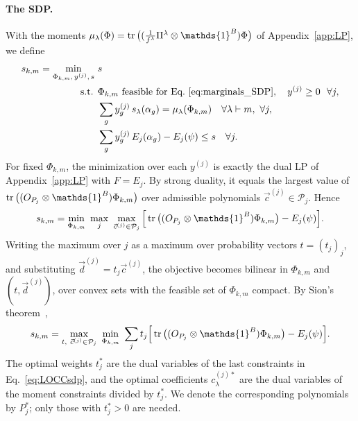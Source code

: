\documentclass[aps,pra,twocolumn,showpacs,superscriptaddress,groupedaddress]{revtex4-2}
\newcommand{\one}[0]{\mathds{1}}
\renewcommand{\a}{\alpha}
\newcommand{\I}{\one}
\begin{document}
\begin{widetext}
\paragraph*{The SDP.}
With the moments $\mu_\lambda(\Phi)=\tr\big((\tfrac{1}{f^\lambda}\Pi^\lambda\otimes\I^B)\Phi\big)$ of Appendix~\ref{app:LP}, we define
\begin{align}\label{eq:LOCCsdp}
    s_{k,m}=\min_{\Phi_{k,m},\,y^{(j)},\,s}\ & s\\
    \text{s.t. }& \Phi_{k,m}\ \text{feasible for Eq.~\eqref{eq:marginals_SDP}},\quad y^{(j)}\geq0\ \ \forall j, \nonumber\\
    & \sum_g y^{(j)}_g\,s_\lambda(\a_g)=\mu_\lambda(\Phi_{k,m})\quad\forall\lambda\vdash m,\ \forall j, \nonumber\\
    & \sum_g y^{(j)}_g\,E_j(\a_g)-E_j(\psi)\leq s\quad\forall j. \nonumber
\end{align}
For fixed $\Phi_{k,m}$, the minimization over each $y^{(j)}$ is exactly the dual LP of Appendix~\ref{app:LP} with $F=E_j$. By strong duality, it equals the largest value of $\tr\big((O_{P_j}\otimes\I^B)\Phi_{k,m}\big)$ over admissible polynomials $\vec c^{(j)}\in\mathcal{P}_j$. Hence
\begin{equation}
    s_{k,m}=\min_{\Phi_{k,m}}\ \max_{j}\ \max_{\vec c^{(j)}\in\mathcal{P}_j}\Big[\tr\big((O_{P_j}\otimes\I^B)\Phi_{k,m}\big)-E_j(\psi)\Big].
\end{equation}
Writing the maximum over $j$ as a maximum over probability vectors $t=(t_j)_j$, and substituting $\vec d^{(j)}=t_j\vec c^{(j)}$, the objective becomes bilinear in $\Phi_{k,m}$ and $(t,\vec d^{(j)})$, over convex sets with the feasible set of $\Phi_{k,m}$ compact. By Sion's theorem~\cite{Sion1958},
\begin{equation}\label{eq:LOCCminimax}
    s_{k,m}=\max_{t,\ \vec c^{(j)}\in\mathcal{P}_j}\ \min_{\Phi_{k,m}}\ \sum_j t_j\Big[\tr\big((O_{P_j}\otimes\I^B)\Phi_{k,m}\big)-E_j(\psi)\Big].
\end{equation}
The optimal weights $t_j^*$ are the dual variables of the last constraints in Eq.~\eqref{eq:LOCCsdp}, and the optimal coefficients $c^{(j)*}_\lambda$ are the dual variables of the moment constraints divided by $t_j^*$. We denote the corresponding polynomials by $P_j^*$; only those with $t^*_j>0$ are needed.


\end{widetext}
\end{document}
